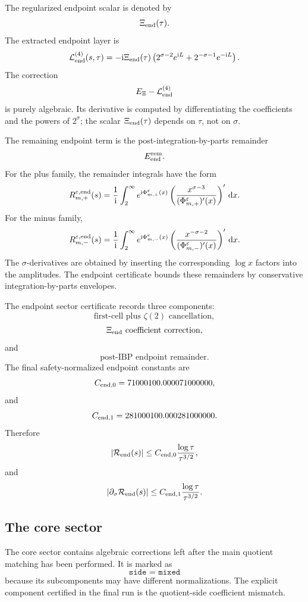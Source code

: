 \documentclass[11pt]{article}
\newcommand{\ii}{\mathrm{i}}
\newcommand{\dd}{\mathrm{d}}
\newcommand{\eps}{\varepsilon}
\newcommand{\s}{s}
\newcommand{\sig}{\sigma}
\newcommand{\tauh}{\tau}
\newcommand{\Rend}{\mathcal R_{\rm end}}
\newcommand{\JSON}[1]{\texttt{#1}}
\begin{document}
The regularized endpoint scalar is denoted by
\[
        \Xi_{\rm end}(\tauh).
\]
The extracted endpoint layer is
\[
        \mathcal L_{\rm end}^{(4)}(\s,\tauh)
        =
        -\ii\Xi_{\rm end}(\tauh)
        \left(
            2^{\sig-2}e^{\ii L}
            +
            2^{-\sig-1}e^{-\ii L}
        \right).
\]
The correction
\[
        E_\Xi-\mathcal L_{\rm end}^{(4)}
\]
is purely algebraic.  Its derivative is computed by differentiating the
coefficients and the powers of \(2^\sig\); the scalar
\(\Xi_{\rm end}(\tauh)\) depends on \(\tauh\), not on \(\sig\).

The remaining endpoint term is the post-integration-by-parts remainder
\[
        E_{\rm end}^{\rm rem}.
\]
For the plus family, the remainder integrals have the form
\[
        R_{m,+}^{\eps,{\rm end}}(\s)
        =
        \frac{1}{\ii}
        \int_2^\infty
        e^{\ii\Phi_{m,+}^{\eps}(x)}
        \left(
            \frac{x^{\sig-3}}
            {(\Phi_{m,+}^{\eps})'(x)}
        \right)'
        \,\dd x.
\]
For the minus family,
\[
        R_{m,-}^{\eps,{\rm end}}(\s)
        =
        \frac{1}{\ii}
        \int_2^\infty
        e^{\ii\Phi_{m,-}^{\eps}(x)}
        \left(
            \frac{x^{-\sig-2}}
            {(\Phi_{m,-}^{\eps})'(x)}
        \right)'
        \,\dd x.
\]
The \(\sig\)-derivatives are obtained by inserting the corresponding
\(\log x\) factors into the amplitudes.  The endpoint certificate bounds these
remainders by conservative integration-by-parts envelopes.

The endpoint sector certificate records three components:
\[
        \text{first-cell plus }\zeta(2)\text{ cancellation},
\]
\[
        \Xi_{\rm end}\text{ coefficient correction},
\]
and
\[
        \text{post-IBP endpoint remainder}.
\]
The final safety-normalized endpoint constants are
\[
        C_{{\rm end},0}
        =
        71000100.000071000000,
\]
and
\[
        C_{{\rm end},1}
        =
        281000100.000281000000.
\]
Therefore
\[
        |\Rend(\s)|
        \le
        C_{{\rm end},0}
        \frac{\log\tauh}{\tauh^{3/2}},
\]
and
\[
        |\partial_\sig\Rend(\s)|
        \le
        C_{{\rm end},1}
        \frac{\log\tauh}{\tauh^{3/2}}.
\]

\subsection{The core sector}

The core sector contains algebraic corrections left after the main quotient
matching has been performed.  It is marked as
\[
        \JSON{side = mixed}
\]
because its subcomponents may have different normalizations.  The explicit
component certified in the final run is the quotient-side coefficient mismatch.
\end{document}
